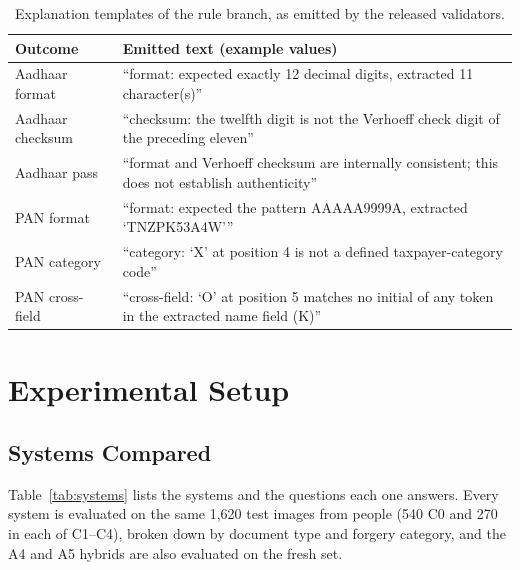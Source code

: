 \documentclass[conference]{IEEEtran}
\begin{document}
\begin{table}[!t]
\caption{Explanation templates of the rule branch, as emitted by the released validators.}
\label{tab:explain}
\centering
\scriptsize
\setlength{\tabcolsep}{3pt}
\renewcommand{\arraystretch}{1.12}
\begin{tabular}{@{}>{\raggedright\arraybackslash}p{1.55cm}>{\raggedright\arraybackslash}p{6.25cm}@{}}
\toprule
Outcome & Emitted text (example values) \\
\midrule
Aadhaar format   & ``format: expected exactly 12 decimal digits, extracted 11 character(s)'' \\
Aadhaar checksum & ``checksum: the twelfth digit is not the Verhoeff check digit of the preceding eleven'' \\
Aadhaar pass     & ``format and Verhoeff checksum are internally consistent; this does not establish authenticity'' \\
PAN format       & ``format: expected the pattern AAAAA9999A, extracted `TNZPK53A4W''' \\
PAN category     & ``category: `X' at position 4 is not a defined taxpayer-category code'' \\
PAN cross-field  & ``cross-field: `O' at position 5 matches no initial of any token in the extracted name field (K)'' \\
\bottomrule
\end{tabular}
\end{table}

\section{Experimental Setup}
\label{sec:setup}

\subsection{Systems Compared}
\label{subsec:configs}

Table~\ref{tab:systems} lists the systems and the questions each one
answers. Every system is evaluated on the same 1{,}620 test images from
\dsTestPer{} people (540 C0 and 270 in each of C1--C4), broken down by
document type and forgery category, and the A4 and A5 hybrids are also
evaluated on the fresh set.
\end{document}
